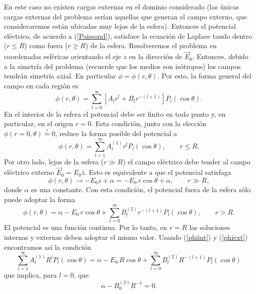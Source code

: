 En este caso no existen cargas externas en el dominio considerado (las únicas cargas externas del problema serían aquellas que generan el campo externo, que consideraremos están ubicadas muy lejos de la esfera). Entonces el potencial eléctrico, de acuerdo a (\ref{Poissond}), satisface la ecuación de Laplace tando dentro ($r\le R$) como fuera ($r\ge R$) de la esfera. Resolveremos el problema en coordenadas esféricas orientando el eje $z$ en la dirección de $\vec{E}_0$. Entonces, debido a la simetría del problema (recuerde que los medios son isótropos) los campos tendrán simetría axial. En particular $\phi=\phi(r,\theta)$. Por esto, la forma general del campo en cada región es
 \begin{equation}
 \phi(r,\theta)=\sum_{l=0}^{\infty}\left[  A_lr^{l}+B_lr^{-(l+1)}\right]
 P_l(\cos\theta).
 \end{equation}
En el interior de la esfera el potencial debe ser finito en todo punto y, en particular, en el origen $r=0$. Esta condición, junto con la elección $\phi (r=0,\theta)\stackrel{!}{=}0$, reduce la forma posible del potencial a 
 \begin{equation}\label{phiint}
 \phi(r,\theta)=\sum_{l=1}^{\infty}A_l^{(1)}r^{l}P_l(\cos\theta), \qquad r\le R.
 \end{equation}
Por otro lado, lejos de la esfera ($r\gg R$) el campo eléctrico debe tender al campo eléctrico externo $\vec{E}_0=E_0\hat{z}$. Esto es equivalente a que el potencial satisfaga
\begin{equation}
 \phi(r,\theta)\to -E_0z+\alpha = -E_0\,r\cos\theta+\alpha, \qquad r\gg R,
\end{equation}
donde $\alpha$ es una constante. Con esta condición, el potencial fuera de la esfera sólo puede adoptar la forma
\begin{equation}\label{phiext}
\phi(r,\theta)=\alpha-E_0\,r\cos\theta+\sum_{l=0}^{\infty}B_l^{(2)}
 r^{-(l+1)}P_l(\cos\theta), \qquad r>R.
\end{equation}
El potencial es una función continua. Por lo tanto, en $r=R$ las soluciones internas y externas deben adoptar el mismo valor. Usando (\ref{phiint}) y (\ref{phiext}) encontramos así la condición
 \begin{equation}
 \sum_{l=1}^{\infty}A_l^{(1)}R^{l}P_l(\cos\theta)  
 =\alpha-E_0\,R\cos\theta+\sum_{l=0}^{\infty}B_l^{(2)}R^{-(l+1)} P_l(\cos\theta)
 \end{equation}
 que implica, para $l=0$, que
\begin{equation}\label{ecl0a}
\alpha-B_0^{(2)}R^{-1}=0.
\end{equation}
